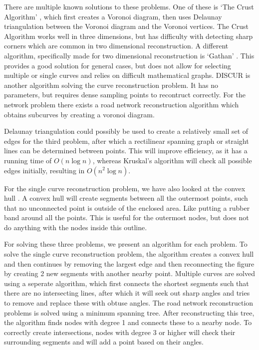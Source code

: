 \documentclass[11pt]{article}
\begin{document}
There are multiple known solutions to these problems. One of these is `The Crust Algorithm' \cite{crust}, which first creates a Voronoi diagram, then uses Delaunay triangulation between the Voronoi diagram and the Voronoi vertices. The Crust Algorithm works well in three dimensions, but has difficulty with detecting sharp corners which are common in two dimensional reconstruction.
A different algorithm, specifically made for two dimensional reconstruction is `Gathan' \cite{gathan}. This provides a good solution for general cases, but does not allow for selecting multiple or single curves and relies on difficult mathematical graphs.
DISCUR \cite{discur} is another algorithm solving the curve reconstruction problem. It has no parameters, but requires dense sampling points to recontruct correctly.
For the network problem there exists a road network reconstruction algorithm \cite{chen} which obtains subcurves by creating a voronoi diagram.

Delaunay triangulation \cite{delaunay} could possibly be used to create a relatively small set of edges for the third problem, after which a rectilinear spanning graph or straight lines can be determined between points. This will improve efficiency, as it has a running time of $O(n \log{n})$, whereas Kruskal's algorithm will check all possible edges initially, resulting in $O(n^2 \log{n})$.

For the single curve reconstruction problem, we have also looked at the convex hull \cite{convex}. A convex hull will create segments between all the outermost points, such that no unconnected point is outside of the enclosed area. Like putting a rubber band around all the points. This is useful for the outermost nodes, but does not do anything with the nodes inside this outline.

For solving these three problems, we present an algorithm for each problem.
To solve the single curve reconstruction problem, the algorithm creates a convex hull and then continues by removing the largest edge and then reconnecting the figure by creating 2 new segments with another nearby point.
Multiple curves are solved using a seperate algorithm, which first connects the shortest segments such that there are no intersecting lines, after which it will seek out sharp angles and tries to remove and replace these with obtuse angles.
The road network reconstruction problems is solved using a minimum spanning tree. After reconstructing this tree, the algorithm finds nodes with degree 1 and connects these to a nearby node. To correctly create intersections, nodes with degree 3 or higher will check their surrounding segments and will add a point based on their angles.
\end{document}
